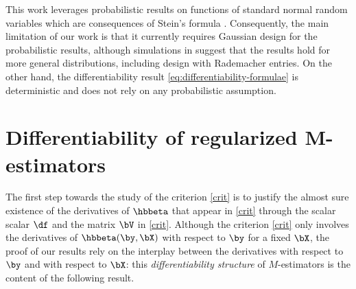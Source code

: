 \documentclass{colt2022} %
\numberwithin{equation}{section}
\begin{document}
This work leverages probabilistic results on
functions of standard normal random variables
\cite{bellec_zhang2019second_poincare}\cite[\S6, \S7]{bellec2020out_of_sample}
which are consequences of Stein's formula \cite{stein1981estimation}.
Consequently, the main limitation of our work is that it currently requires
Gaussian design for the probabilistic results,
although simulations in 
    suggest that the results hold for more general distributions,
    including design with Rademacher entries.
On the other hand,
the differentiability result \eqref{eq:differentiability-formulae}
is deterministic and does not rely on any probabilistic assumption.

\section{Differentiability of regularized M-estimators}
\label{sec:Differentiability}

The first step towards the study of the criterion \eqref{crit}
is to justify the almost sure existence of the derivatives of $\hbbeta$
that appear in \eqref{crit} through the scalar
scalar $\df$ and the matrix $\bV$ in \eqref{crit}.
Although the criterion \eqref{crit} only involves the derivatives 
of $\hbbeta(\by,\bX)$ with respect to $\by$ for a fixed $\bX$, the proof
of our results rely on the interplay between the derivatives
with respect to $\by$ and with respect to $\bX$:
this \emph{differentiability structure} of $M$-estimators is
the content of the following result.
\end{document}
